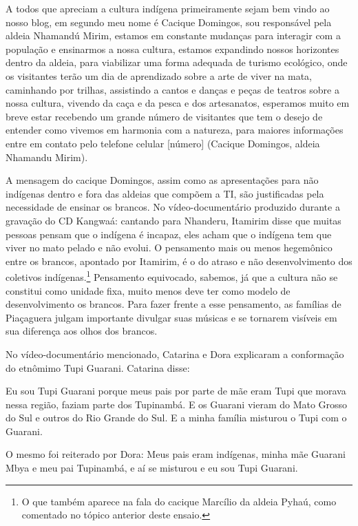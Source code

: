 \documentclass{article}
\begin{document}
A todos que apreciam a cultura ind\'igena primeiramente sejam bem vindo
ao nosso blog, em segundo meu nome \'e Cacique Domingos, sou
respons\'avel pela aldeia Nhamand\'u Mirim, estamos em constante
mudan\c{c}as para interagir com a popula\c{c}\~ao e ensinarmos a nossa
cultura, estamos expandindo nossos horizontes dentro da aldeia, para
viabilizar uma forma adequada de turismo ecol\'ogico, onde os
visitantes ter\~ao um dia de aprendizado sobre a arte de viver na mata,
caminhando por trilhas, assistindo a cantos e dan\c{c}as e pe\c{c}as de
teatros sobre a nossa cultura, vivendo da ca\c{c}a e da pesca e dos
artesanatos, esperamos muito em breve estar recebendo um grande
n\'umero de visitantes que tem o desejo de entender como vivemos em
harmonia com a natureza, para maiores informa\c{c}\~oes entre em
contato pelo telefone celular [n\'umero] (Cacique Domingos, aldeia
Nhamandu Mirim).

A mensagem do cacique Domingos, assim como as apresenta\c{c}\~oes para
n\~ao ind\'igenas dentro e fora das aldeias que comp\~oem a TI, s\~ao
justificadas pela necessidade de ensinar os brancos. No
v\'ideo-document\'ario produzido durante a grava\c{c}\~ao do CD
Kangwa\'a:  cantando para Nhanderu, Itamirim disse que muitas pessoas
pensam que o ind\'igena \'e incapaz, eles acham que o ind\'igena tem
que viver no mato pelado e n\~ao evolui. O pensamento mais ou menos
hegem\^onico entre os brancos, apontado por Itamirim, \'e o do atraso e
n\~ao desenvolvimento dos coletivos ind\'igenas.\footnote{ O que
tamb\'em aparece na fala do cacique Marc\'ilio da aldeia Pyha\'u, como
comentado no t\'opico anterior deste ensaio.} Pensamento equivocado,
sabemos, j\'a que a cultura n\~ao se constitui como unidade fixa, muito
menos deve ter como modelo de desenvolvimento os brancos. Para fazer
frente a esse pensamento, as fam\'ilias de Pia\c{c}aguera julgam
importante divulgar suas m\'usicas e se tornarem vis\'iveis em sua
diferen\c{c}a aos olhos dos brancos.

No v\'ideo-document\'ario mencionado, Catarina e Dora explicaram a
conforma\c{c}\~ao do etn\^omimo Tupi Guarani. Catarina disse: 

Eu sou Tupi Guarani porque meus pais por parte de m\~ae eram Tupi que
morava nessa regi\~ao, faziam parte dos Tupinamb\'a. E os Guarani
vieram do Mato Grosso do Sul e outros do Rio Grande do Sul. E a minha
fam\'ilia misturou o Tupi com o Guarani.

O mesmo foi reiterado por Dora: Meus pais eram ind\'igenas, minha m\~ae
Guarani Mbya e meu pai Tupinamb\'a, e a\'i se misturou e eu sou Tupi
Guarani.
\end{document}
